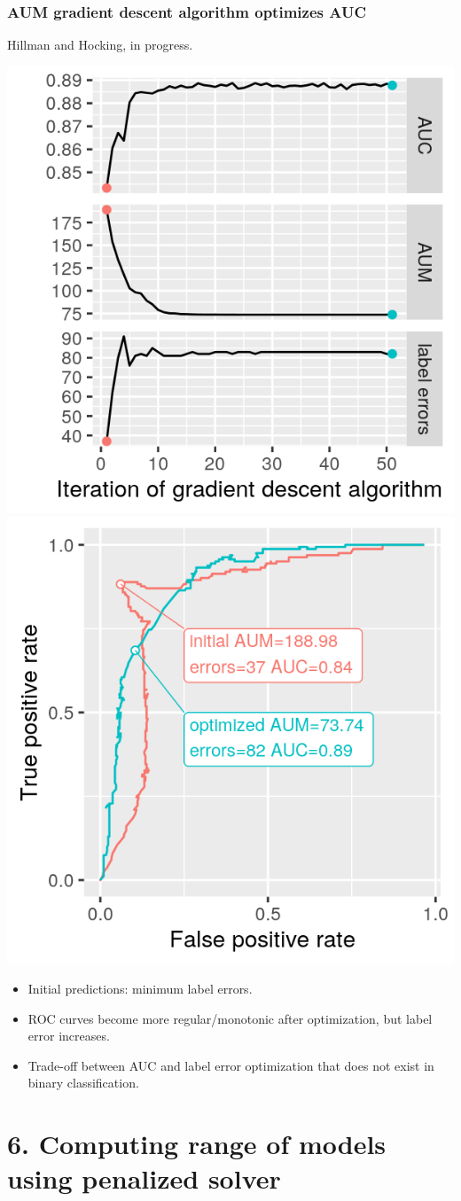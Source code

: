\documentclass{beamer}
\begin{document}
\begin{frame}
  \frametitle{AUM gradient descent algorithm optimizes AUC}
  
  Hillman and Hocking, in progress.

  \includegraphics[width=0.49\linewidth]{figure-aum-optimized-iterations-emph}
  \includegraphics[width=0.49\linewidth]{figure-aum-train-pred-only} 

  \begin{itemize}
  \item Initial predictions: minimum label errors.
  \item ROC curves become more regular/monotonic after optimization,
    but label error increases.
  \item Trade-off between AUC and label error optimization that does
    not exist in binary classification.
  \end{itemize}
\end{frame}

\section{6. Computing range of models using penalized solver} 
 
\end{document}
